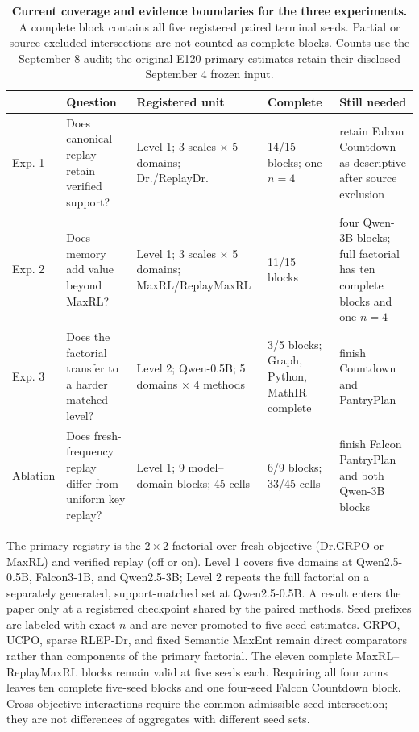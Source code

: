 \documentclass{article}
\newcommand{\1}{\mathbf 1}
\theoremstyle{remark}
\theoremstyle{definition}
\theoremstyle{plain}
\begin{document}
\begin{table}[H]
  \centering
  \caption{\textbf{Current coverage and evidence boundaries for the three
  experiments.} A complete block contains all five registered paired
  terminal seeds. Partial or source-excluded intersections are not counted as complete blocks.
  Counts use the September 8 audit; the original E120 primary estimates
  retain their disclosed September 4 frozen input.}
  \label{tab:experiment-map}
  \scriptsize
  \setlength{\tabcolsep}{3pt}
  \begin{tabularx}{\linewidth}{@{}P{.09\linewidth}P{.27\linewidth}P{.25\linewidth}P{.15\linewidth}Y@{}}
    \toprule
    & \textbf{Question} & \textbf{Registered unit} & \textbf{Complete} &
      \textbf{Still needed} \\
    \midrule
    Exp. 1 & Does canonical replay retain verified support? &
      Level 1; 3 scales $\times$ 5 domains; Dr./ReplayDr. &
      14/15 blocks; one $n=4$ & retain Falcon Countdown as descriptive after source exclusion \\
    Exp. 2 & Does memory add value beyond MaxRL? &
      Level 1; 3 scales $\times$ 5 domains; MaxRL/ReplayMaxRL &
      11/15 blocks & four Qwen-3B blocks; full factorial has ten complete blocks and one $n=4$ \\
    Exp. 3 & Does the factorial transfer to a harder matched level? &
      Level 2; Qwen-0.5B; 5 domains $\times$ 4 methods &
      3/5 blocks; Graph, Python, MathIR complete & finish Countdown and PantryPlan \\
    Ablation & Does fresh-frequency replay differ from uniform key replay? &
      Level 1; 9 model--domain blocks; 45 cells &
      6/9 blocks; 33/45 cells & finish Falcon PantryPlan and both Qwen-3B blocks \\
    \bottomrule
  \end{tabularx}
\end{table}


The primary registry is the $2\times2$ factorial over fresh objective
(Dr.GRPO or MaxRL) and verified replay (off or on). Level 1 covers five domains
at Qwen2.5-0.5B, Falcon3-1B, and Qwen2.5-3B; Level 2 repeats the full factorial
on a separately generated, support-matched set at Qwen2.5-0.5B. A result enters
the paper only at a registered checkpoint shared by the paired methods. Seed
prefixes are labeled with exact $n$ and are never promoted to five-seed
estimates. GRPO, UCPO, sparse RLEP-Dr, and fixed Semantic MaxEnt remain direct
comparators rather than components of the primary factorial. The eleven complete
MaxRL--ReplayMaxRL blocks remain valid at five seeds each. Requiring all four
arms leaves ten complete five-seed blocks and one four-seed Falcon Countdown
block. Cross-objective interactions require the common admissible seed
intersection; they are not differences of aggregates with different seed sets.
\end{document}
